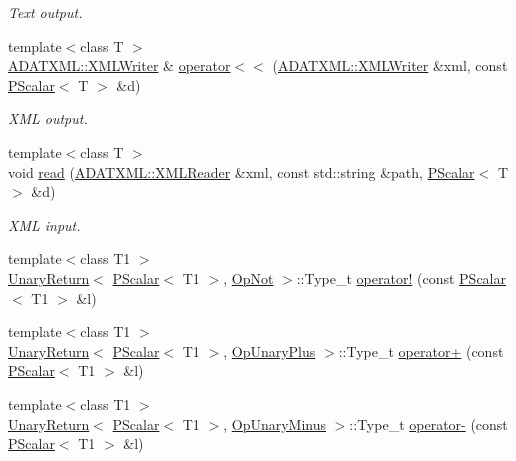 \begin{DoxyCompactItemize}
\begin{DoxyCompactList}\small\item\em Text output. \end{DoxyCompactList}\item 
{\footnotesize template$<$class T $>$ }\\\mbox{\hyperlink{classADATXML_1_1XMLWriter}{A\+D\+A\+T\+X\+M\+L\+::\+X\+M\+L\+Writer}} \& \mbox{\hyperlink{group__primscalar_ga7c71fa022421c2fa564d74338851def4}{operator$<$$<$}} (\mbox{\hyperlink{classADATXML_1_1XMLWriter}{A\+D\+A\+T\+X\+M\+L\+::\+X\+M\+L\+Writer}} \&xml, const \mbox{\hyperlink{classENSEM_1_1PScalar}{P\+Scalar}}$<$ T $>$ \&d)
\begin{DoxyCompactList}\small\item\em X\+ML output. \end{DoxyCompactList}\item 
{\footnotesize template$<$class T $>$ }\\void \mbox{\hyperlink{group__primscalar_ga882ac6046905c4b049ed86cd7668b32a}{read}} (\mbox{\hyperlink{classADATXML_1_1XMLReader}{A\+D\+A\+T\+X\+M\+L\+::\+X\+M\+L\+Reader}} \&xml, const std\+::string \&path, \mbox{\hyperlink{classENSEM_1_1PScalar}{P\+Scalar}}$<$ T $>$ \&d)
\begin{DoxyCompactList}\small\item\em X\+ML input. \end{DoxyCompactList}\item 
{\footnotesize template$<$class T1 $>$ }\\\mbox{\hyperlink{structENSEM_1_1UnaryReturn}{Unary\+Return}}$<$ \mbox{\hyperlink{classENSEM_1_1PScalar}{P\+Scalar}}$<$ T1 $>$, \mbox{\hyperlink{structENSEM_1_1OpNot}{Op\+Not}} $>$\+::Type\+\_\+t \mbox{\hyperlink{group__primscalar_gafea5191a2ebdc35856d62d9284d246be}{operator!}} (const \mbox{\hyperlink{classENSEM_1_1PScalar}{P\+Scalar}}$<$ T1 $>$ \&l)
\item 
{\footnotesize template$<$class T1 $>$ }\\\mbox{\hyperlink{structENSEM_1_1UnaryReturn}{Unary\+Return}}$<$ \mbox{\hyperlink{classENSEM_1_1PScalar}{P\+Scalar}}$<$ T1 $>$, \mbox{\hyperlink{structENSEM_1_1OpUnaryPlus}{Op\+Unary\+Plus}} $>$\+::Type\+\_\+t \mbox{\hyperlink{group__primscalar_ga507ae93c4b44a876ae4bf65b02462270}{operator+}} (const \mbox{\hyperlink{classENSEM_1_1PScalar}{P\+Scalar}}$<$ T1 $>$ \&l)
\item 
{\footnotesize template$<$class T1 $>$ }\\\mbox{\hyperlink{structENSEM_1_1UnaryReturn}{Unary\+Return}}$<$ \mbox{\hyperlink{classENSEM_1_1PScalar}{P\+Scalar}}$<$ T1 $>$, \mbox{\hyperlink{structENSEM_1_1OpUnaryMinus}{Op\+Unary\+Minus}} $>$\+::Type\+\_\+t \mbox{\hyperlink{group__primscalar_ga827ddd79e3c1d2cd23eb9712523df1c9}{operator-\/}} (const \mbox{\hyperlink{classENSEM_1_1PScalar}{P\+Scalar}}$<$ T1 $>$ \&l)

\end{DoxyCompactItemize}
